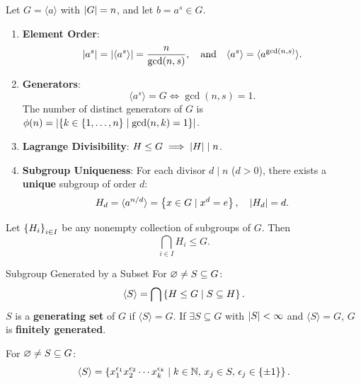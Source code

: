 \documentclass[12pt,a4paper]{article}
\begin{document}
    \begin{thm}
        Let $G = \langle a \rangle$ with $\left\lvert G \right\rvert = n$, and let $b = a^s \in G$.
        \begin{enumerate}
            \item \textbf{Element Order}:
            \[
                \left\lvert a^s \right\rvert = \left\lvert \langle a^s \rangle \right\rvert = \frac{n}{\gcd(n, s)}, \quad\text{and}\quad \langle a^s \rangle = \langle a^{\gcd(n, s)} \rangle.
            \]
            \item \textbf{Generators}:
            \[
                \langle a^s \rangle = G \iff \gcd(n, s) = 1.
            \]
            The number of distinct generators of $G$ is $\phi(n) = \left\lvert \left\{ k \in \left\{ 1,\ldots,n \right\} \mid \gcd(n, k) = 1 \right\} \right\rvert$.
            \item \textbf{Lagrange Divisibility}: $H \le G \implies \left\lvert H \right\rvert \mid n$.
            \item \textbf{Subgroup Uniqueness}: For each divisor $d \mid n$ ($d > 0$), there exists a \textbf{unique} subgroup of order $d$:
            \[
                H_d = \langle a^{n/d} \rangle = \left\{ x \in G \mid x^d = e \right\}, \quad \left\lvert H_d \right\rvert = d.
            \]
        \end{enumerate}
    \end{thm}
    \bigskip
    
    \begin{thm}
        Let $\left\{ H_i \right\}_{i \in I}$ be any nonempty collection of subgroups of $G$. Then
        \[
            \bigcap_{i \in I} H_i \le G.
        \]
    \end{thm}
    \bigskip
    
    \begin{defi}{Subgroup Generated by a Subset}
        For $\varnothing \neq S \subseteq G$:
        \[
            \langle S \rangle = \bigcap \left\{ H \le G \mid S \subseteq H \right\}.
        \]
        $S$ is a \textbf{generating set} of $G$ if $\langle S \rangle = G$. If $\exists S \subseteq G$ with $\left\lvert S \right\rvert < \infty$ and $\langle S \rangle = G$, $G$ is \textbf{finitely generated}.
    \end{defi}
    \bigskip
    
    \begin{thm}
        For $\varnothing \neq S \subseteq G$:
        \[
            \langle S \rangle = \left\{ x_1^{\epsilon_1} x_2^{\epsilon_2} \cdots x_k^{\epsilon_k} \mid k \in \mathbb{N}, \, x_j \in S, \, \epsilon_j \in \left\{ \pm 1 \right\} \right\}.
        \]
    \end{thm}
    \bigskip
\end{document}
